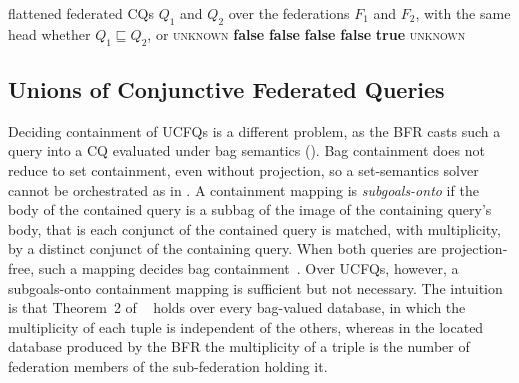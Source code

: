 \begin{algorithm}
  \caption{Deciding containment of federated \acp{CQ}}
  \label{alg_federated_containment}
  \begin{algorithmic}[1]
    \Require flattened federated \acp{CQ} $Q_1$ and $Q_2$ over the federations $F_1$ and $F_2$, with the same head
    \Ensure whether $Q_1 \sqsubseteq Q_2$, or \textsc{unknown}
      \State \Return \textbf{false}
    \EndIf
        \State \Return \textbf{false}
      \EndIf
    \EndFor
      \State \Return \textbf{false}
    \EndIf
      \State \Return {}
    \EndIf
      \State \Return {}
    \EndIf
      \State \Return \textbf{false}
    \EndIf
      \State \Return \textbf{true}
    \EndIf
    \State \Return \textsc{unknown}
  \end{algorithmic}
\end{algorithm}

\subsection{Unions of Conjunctive Federated Queries}\label{sec:algorithm_ucfq}

Deciding containment of \acp{UCFQ} is a different problem, as the \ac{BFR} casts such a query into a \ac{CQ} evaluated under bag semantics ().
Bag containment does not reduce to set containment, even without projection, so a set-semantics solver cannot be orchestrated as in .
A containment mapping is \emph{subgoals-onto} if the body of the contained query is a subbag of the image of the containing query's body, that is each conjunct of the contained query is matched, with multiplicity, by a distinct conjunct of the containing query.
When both queries are projection-free, such a mapping decides bag containment~\cite[Theorem~2]{Afrati2010}.
Over \acp{UCFQ}, however, a subgoals-onto containment mapping is sufficient but not necessary.
The intuition is that Theorem~2 of \citeauthor{Afrati2010}~\cite{Afrati2010} holds over every bag-valued database, in which the multiplicity of each tuple is independent of the others, whereas in the located database produced by the \ac{BFR} the multiplicity of a triple is the number of federation members of the sub-federation holding it.

